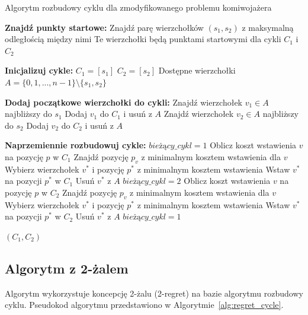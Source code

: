 \documentclass[12pt,a4paper]{article}
\begin{document}
\begin{algorithm}
\caption{Algorytm rozbudowy cyklu dla zmodyfikowanego problemu komiwojażera}
\label{alg:greedy_cycle}
\begin{algorithmic}[1]
\State \textbf{Znajdź punkty startowe:}
\State Znajdź parę wierzchołków $(s_1, s_2)$ z maksymalną odległością między nimi
\State Te wierzchołki będą punktami startowymi dla cykli $C_1$ i $C_2$

\State \textbf{Inicjalizuj cykle:}
\State $C_1 = [s_1]$
\State $C_2 = [s_2]$
\State Dostępne wierzchołki $A = \{0, 1, ..., n-1\} \setminus \{s_1, s_2\}$

\State \textbf{Dodaj początkowe wierzchołki do cykli:}
    \State Znajdź wierzchołek $v_1 \in A$ najbliższy do $s_1$
    \State Dodaj $v_1$ do $C_1$ i usuń z $A$
        \State Znajdź wierzchołek $v_2 \in A$ najbliższy do $s_2$
        \State Dodaj $v_2$ do $C_2$ i usuń z $A$
    \EndIf
\EndIf

\State \textbf{Naprzemiennie rozbudowuj cykle:}
\State $bieżący\_cykl = 1$ 
                \State Oblicz koszt wstawienia $v$ na pozycję $p$ w $C_1$
            \EndFor
            \State Znajdź pozycję $p_v$ z minimalnym kosztem wstawienia dla $v$
        \EndFor
        \State Wybierz wierzchołek $v^*$ i pozycję $p^*$ z minimalnym kosztem wstawienia
        \State Wstaw $v^*$ na pozycji $p^*$ w $C_1$
        \State Usuń $v^*$ z $A$
        \State $bieżący\_cykl = 2$
    \Else
                \State Oblicz koszt wstawienia $v$ na pozycję $p$ w $C_2$
            \EndFor
            \State Znajdź pozycję $p_v$ z minimalnym kosztem wstawienia dla $v$
        \EndFor
        \State Wybierz wierzchołek $v^*$ i pozycję $p^*$ z minimalnym kosztem wstawienia
        \State Wstaw $v^*$ na pozycji $p^*$ w $C_2$
        \State Usuń $v^*$ z $A$
        \State $bieżący\_cykl = 1$
    \EndIf
\EndWhile

\State \Return $(C_1, C_2)$
\end{algorithmic}
\end{algorithm}

\subsection{Algorytm z 2-żalem}
Algorytm wykorzystuje koncepcję 2-żalu (2-regret) na bazie algorytmu rozbudowy cyklu. Pseudokod algorytmu przedstawiono w Algorytmie~\ref{alg:regret_cycle}.
\end{document}
